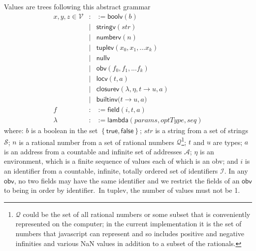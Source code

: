 \documentclass[12pt]{article}
\begin{document}
Values are trees following this abstract grammar%
\begin{eqnarray*}
x,y,z\in \mathcal{V} &:&:=\mathsf{boolv}\left( b\right)  \\
&\mid &\mathsf{stringv}\left( \mathit{str}\right)  \\
&\mid &\mathsf{numberv}\left( n\right)  \\
&\mid &\mathsf{tuplev}\left( x_{0},x_{1},\ldots x_{k}\right)  \\
&\mid &\mathsf{nullv} \\
&\mid &\mathsf{obv}\left( f_{0},f_{1},...f_{k}\right)  \\
&\mid &\mathsf{locv}\left( t,a\right)  \\
&\mid &\mathsf{closurev}\left( \lambda ,\eta ,t\rightarrow u,a\right)  \\
&\mid &\mathsf{builtinv(}t\rightarrow u,a) \\
f &:&:=\mathsf{field}(i,t,a) \\
\lambda  &:&:=\mathsf{lambda}(\mathit{params},\mathit{optType,seq})
\end{eqnarray*}%
where: $b$ is a boolean in the set $\left\{ \mathsf{true,false}\right\} $; $%
\mathit{str}$ is a string from a set of strings $\mathcal{S}$; $n$ is a
rational number from a set of rational numbers $\mathcal{Q}$\footnote{$%
\mathcal{Q}$ could be the set of all rational numbers or some subset that is
conveniently represented on the computer; in the current implementation it
is the set of numbers that javascript can represent and so includes positive
and negative infinities and various NaN values in addition to a subset of
the rationals.}; $t$ and $u$ are types; $a$ is an address from a countable
and infinite set of addresses $\mathcal{A}$; $\eta $ is an environment,
which is a finite sequence of values each of which is an \textsf{obv}; and $i
$ is an identifier from a countable, infinite, totally ordered set of
identifiers $\mathcal{I}$. In any $\mathsf{obv}$, no two fields may have the
same identifier and we restrict the fields of an $\mathsf{obv}$ to being in
order by identifier.\ In \textsf{tuplev}, the number of values must not be 1.
\end{document}
